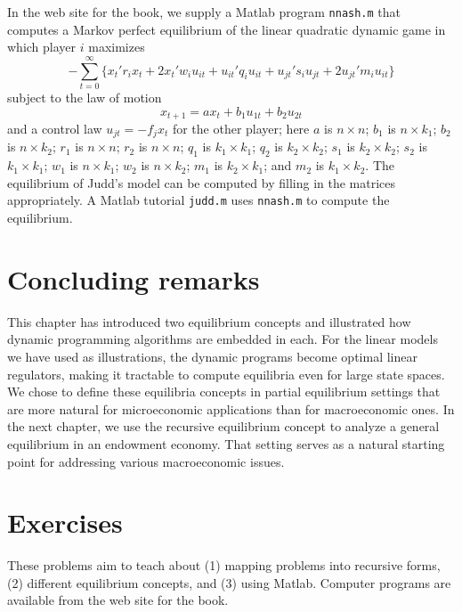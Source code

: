 In the web site for the book,
we supply a Matlab program {\tt nnash.m} that
computes a Markov perfect equilibrium of
the linear quadratic dynamic game
in which player $i$ maximizes
$$ - \sum_{t=0}^\infty \{ x_t' r_i x_t + 2 x_t' w_i u_{it} +u_{it}' q_i
  u_{it} + u_{jt}' s_i u_{jt} + 2 u_{jt}' m_i u_{it} \}$$
subject to the law of motion
$$x_{t+1} = a x_t + b_1 u_{1t}+b_2 u_{2t}$$
and a control law $u_{jt}= -f_j x_t$ for the other player; here
$a$ is $n \times n$; $b_1$ is $n \times k_1$; $b_2$ is $n \times k_2$;
$r_1$ is $n\times n$; $r_2$ is $ n \times n$;
$q_1$ is $k_1 \times k_1$; $q_2$ is $k_2 \times k_2$;
$s_1$ is $k_2 \times k_2$; $s_2$ is $k_1 \times k_1$;
$w_1$ is  $n \times k_1$;
$w_2$ is $n \times k_2$;
$m_1$ is $ k_2 \times k_1$; and  $m_2$ is $k_1 \times k_2$.
The equilibrium of Judd's model can be computed by
filling in the matrices appropriately.  A Matlab tutorial
{\tt judd.m} uses {\tt nnash.m} to compute the equilibrium.

\section{Concluding remarks}

  This chapter has introduced two
equilibrium concepts and illustrated how dynamic programming
algorithms are embedded in each.   For the linear models we have
used as illustrations,  the dynamic programs become optimal
linear regulators, making it tractable to compute equilibria
even for large state spaces.
We chose to define these equilibria concepts in
partial equilibrium settings
that are more natural for microeconomic applications than for
macroeconomic ones.  In the next chapter, we
use the recursive equilibrium concept to analyze
a general equilibrium in an endowment economy. That setting
serves as a natural starting point for addressing various
macroeconomic issues.


\showchaptIDfalse
\showsectIDfalse
\section{Exercises}
\showchaptIDtrue
\showsectIDtrue
\medskip
\medskip
\noindent
These problems aim to teach about (1) mapping problems into
recursive forms, (2) different equilibrium concepts,
and (3) using Matlab.  Computer programs
are available from the web site for the book. %

